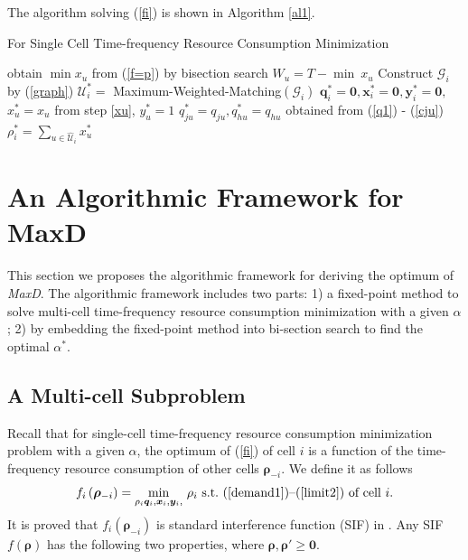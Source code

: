 \documentclass[10pt,journal,final,finalsubmission,twocolumn]{IEEEtran}
\begin{document}
The algorithm solving (\ref{fi}) is shown in Algorithm \ref{al1}.

 \begin{algorithm}[tbp]\label{al1}
\caption{For Single Cell Time-frequency Resource Consumption Minimization} 
{
	obtain $\min x_u$ from (\ref{f=p}) by bisection search\label{xu}\;
	$W_u = T - \min \ x_u$\;
}
Construct $\mathcal{G}_i$ by (\ref{graph})\;
$\mathcal{U}^*_i= $ Maximum-Weighted-Matching$\left (\mathcal{G}_i\right)$\label{MWM}\;
$\boldsymbol{q}^*_i = \boldsymbol{0},\boldsymbol{x}^*_i = \boldsymbol{0}, \boldsymbol{y}^*_i = \boldsymbol{0},$\;
{
$x_u^* = x_u$ from step \ref{xu}, $y_u^*=1$\;
$q_{ju}^*=q_{ju}, q_{hu}^*=q_{hu}$ obtained from (\ref{q1}) - (\ref{cju})\;
}
$\rho_i^*=\sum_{u\in\widehat{\mathcal{U}}_i} x_u^*$\;
\;
\end{algorithm} 


\section{An Algorithmic Framework for MaxD}\label{CellLoadsMinimization}

This section we proposes the algorithmic framework for deriving the optimum of {\em MaxD}. The algorithmic framework includes two parts: 1) a fixed-point method to solve multi-cell time-frequency resource consumption minimization with a given $\alpha$; 2) by embedding the fixed-point method into bi-section search to find the optimal $\alpha^*$.

\subsection{A Multi-cell Subproblem }\label{MulticellLoadsMinimization}

Recall that for single-cell time-frequency resource consumption minimization problem with a given $\alpha$, the optimum of (\ref{fi}) of cell $i$ is a function of the time-frequency resource consumption of other cells $\boldsymbol{\rho}_{-i}$. We define it as follows
\begin{equation}\label{fi2}
f_i\left (\boldsymbol{\rho}_{-i}\right ) =  \underset{\rho_i \boldsymbol{q}_i,\boldsymbol{x}_i,\boldsymbol{y}_i,}{\min} \ \rho_i\  \textup{s.t.\ (\ref{demand1})--(\ref{limit2}) of cell $i$} .
\end{equation}
It is proved that $f_i\left (\boldsymbol{\rho}_{-i}\right )$ is standard interference function (SIF) in \cite{Yates}. Any SIF $f\left( \boldsymbol{\rho}\right)$ has the following two properties, where $\boldsymbol{\rho}, \boldsymbol{\rho}' \geq \boldsymbol{0}$.
\end{document}
